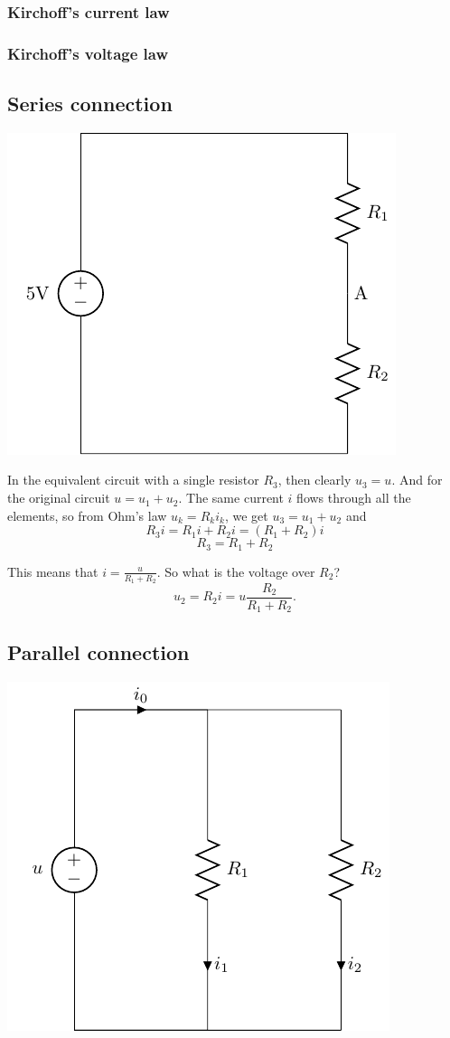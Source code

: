 \documentclass[a4paper]{scrartcl}
\begin{document}
\subsubsection{Kirchoff's current law}
\label{sec-2-4-2}

\subsubsection{Kirchoff's voltage law}
\label{sec-2-4-3}

\subsection{Series connection}
\label{sec-2-5}
\begin{center}
\includegraphics[width=0.4\linewidth]{../../figures/voltage-divider-circuit}
\end{center}
In the equivalent circuit with a single resistor $R_3$, then clearly $u_3=u$. And for the original circuit $u = u_1 + u_2$. The same current $i$ flows through all the elements, so from Ohm's law $u_k = R_k i_k$, we get
\( u_3 = u_1 + u_2\) and
\[ R_3 i = R_1 i + R_2 i = (R_1 + R_2) i \]
\[ R_3 = R_1 + R_2\]

This means that $i = \frac{u}{R_1 + R_2}$. So what is the voltage over $R_2$?
\[ u_2 = R_2 i = u \frac{R_2}{R_1 + R_2}. \]

\subsection{Parallel connection}
\label{sec-2-6}

\begin{center}
\includegraphics[width=0.4\linewidth]{../../figures/parallel-circuit}
\end{center}
\end{document}
